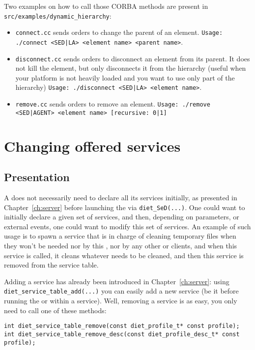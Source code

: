 Two examples on how to call those CORBA methods are present in\newline
\texttt{src/examples/dynamic\_hierarchy}:
\begin{itemize}
\item \texttt{connect.cc} sends orders to change the parent of an element.\newline
%
    \texttt{Usage: ./connect <SED|LA> <element name> <parent name>}.

\item \texttt{disconnect.cc} sends orders to disconnect an element
  from its parent. It does not kill the element, but only disconnects
  it from the \diet hierarchy (useful when your platform is not
  heavily loaded and you want to use only part of the
  hierarchy)\newline
%
  \texttt{Usage: ./disconnect <SED|LA> <element name>}.

\item \texttt{remove.cc} sends orders to remove an element.\newline
%
    \texttt{Usage: ./remove <SED|AGENT> <element name> [recursive: 0|1]}
\end{itemize}


\section{Changing offered services}

\subsection{Presentation}
A \sed does not necessarily need to declare all its services
initially, \ie as presented in Chapter~\ref{ch:server} before
launching the \sed via \verb|diet_SeD(...)|. One could want to
initially declare a given set of services, and then, depending on
parameters, or external events, one could want to modify this set of
services. An example of such usage is to spawn a service that is in
charge of cleaning temporary files when they won't be needed nor by
this \sed, nor by any other \sed or clients, and when this service is
called, it cleans whatever needs to be cleaned, and then this service
is removed from the service table.

Adding a service has already been introduced in
Chapter~\ref{ch:server}: using \verb|diet_service_table_add(...)| you
can easily add a new service (be it before running the \sed or within
a service). Well, removing a service is as easy, you only need to call
one of these methods:
{\footnotesize
\begin{verbatim}
int diet_service_table_remove(const diet_profile_t* const profile);
int diet_service_table_remove_desc(const diet_profile_desc_t* const profile);
\end{verbatim}
}


